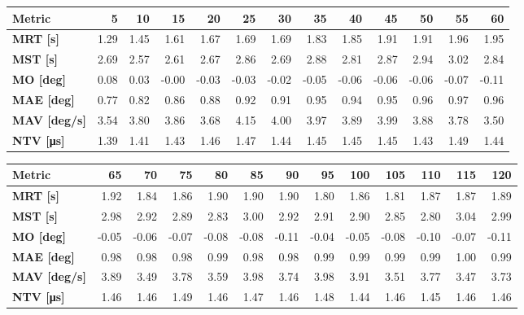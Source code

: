 \begin{tabular*}{\textwidth}{@{\extracolsep{\fill}}l|rrrrrrrrrrrr}
    \toprule
    \textbf{Metric} & \textbf{5} & \textbf{10} & \textbf{15} & \textbf{20} & \textbf{25} & \textbf{30} & \textbf{35} & \textbf{40} & \textbf{45} & \textbf{50} & \textbf{55} & \textbf{60} \\
    \midrule
    \textbf{MRT [s]} & 1.29 & 1.45 & 1.61 & 1.67 & 1.69 & 1.69 & 1.83 & 1.85 & 1.91 & 1.91 & 1.96 & 1.95 \\
    \textbf{MST [s]} & 2.69 & 2.57 & 2.61 & 2.67 & 2.86 & 2.69 & 2.88 & 2.81 & 2.87 & 2.94 & 3.02 & 2.84 \\
    \textbf{MO  [deg]} & 0.08 & 0.03 & -0.00 & -0.03 & -0.03 & -0.02 & -0.05 & -0.06 & -0.06 & -0.06 & -0.07 & -0.11 \\
    \textbf{MAE [deg]} & 0.77 & 0.82 & 0.86 & 0.88 & 0.92 & 0.91 & 0.95 & 0.94 & 0.95 & 0.96 & 0.97 & 0.96 \\
    \textbf{MAV [deg/s]} & 3.54 & 3.80 & 3.86 & 3.68 & 4.15 & 4.00 & 3.97 & 3.89 & 3.99 & 3.88 & 3.78 & 3.50 \\
    \textbf{NTV [\si{\micro\second}]} & 1.39 & 1.41 & 1.43 & 1.46 & 1.47 & 1.44 & 1.45 & 1.45 & 1.45 & 1.43 & 1.49 & 1.44 \\
    \bottomrule
\end{tabular*}

\begin{tabular*}{\textwidth}{@{\extracolsep{\fill}}l|rrrrrrrrrrrr}
    \toprule
    \textbf{Metric} & \textbf{65} & \textbf{70} & \textbf{75} & \textbf{80} & \textbf{85} & \textbf{90} & \textbf{95} & \textbf{100} & \textbf{105} & \textbf{110} & \textbf{115} & \textbf{120} \\
    \midrule
    \textbf{MRT [s]} & 1.92 & 1.84 & 1.86 & 1.90 & 1.90 & 1.90 & 1.80 & 1.86 & 1.81 & 1.87 & 1.87 & 1.89 \\
    \textbf{MST [s]} & 2.98 & 2.92 & 2.89 & 2.83 & 3.00 & 2.92 & 2.91 & 2.90 & 2.85 & 2.80 & 3.04 & 2.99 \\
    \textbf{MO  [deg]} & -0.05 & -0.06 & -0.07 & -0.08 & -0.08 & -0.11 & -0.04 & -0.05 & -0.08 & -0.10 & -0.07 & -0.11 \\
    \textbf{MAE [deg]} & 0.98 & 0.98 & 0.98 & 0.99 & 0.98 & 0.98 & 0.99 & 0.99 & 0.99 & 0.99 & 1.00 & 0.99 \\
    \textbf{MAV [deg/s]} & 3.89 & 3.49 & 3.78 & 3.59 & 3.98 & 3.74 & 3.98 & 3.91 & 3.51 & 3.77 & 3.47 & 3.73 \\
    \textbf{NTV [\si{\micro\second}]} & 1.46 & 1.46 & 1.49 & 1.46 & 1.47 & 1.46 & 1.48 & 1.44 & 1.46 & 1.45 & 1.46 & 1.46 \\
    \bottomrule
\end{tabular*}

